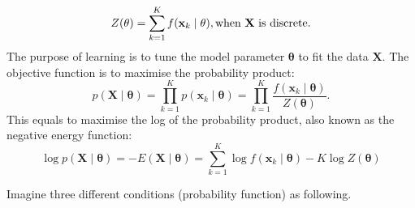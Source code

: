 \documentclass[11pt,twoside,a4paper]{article}
\begin{document}
	\begin{equation}
	\label{equ:z_dis}
	Z( \mathbf{\theta}) = \sum_{k=1}^K f(\mathbf{x}_k \mid \mathbf{\theta} ), \text{when  $ \mathbf{X} $ is discrete.}
	\end{equation}
	The purpose of learning is to tune the model parameter $ \mathbf{\theta} $ to fit the data $ \mathbf{X}  $. 
	The objective function is to maximise the probability product:
	\begin{equation}
	 p(\mathbf{X} \mid \mathbf{\theta} ) = \prod_{k=1}^K p(\mathbf{x}_k \mid \mathbf{\theta} ) =  \prod_{k=1}^K\dfrac{f(\mathbf{x}_k \mid \mathbf{\theta} )}{Z( \mathbf{\theta})}.
	\end{equation}
	 This equals to maximise the log of the probability product, also known as the negative energy function:
	\begin{equation}
	\label{equ:energy}
	  \log p(\mathbf{X} \mid \mathbf{\theta} ) = -E(\mathbf{X} \mid \mathbf{\theta} )  =  \sum_{k=1}^K\log f(\mathbf{x}_k \mid \mathbf{\theta} ) - K\log Z( \mathbf{\theta})
	\end{equation}
	
	Imagine three different conditions (probability function) as following.
	
\end{document}
